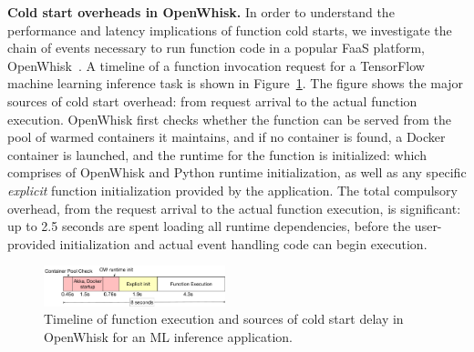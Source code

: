 \noindent \textbf{Cold start overheads in OpenWhisk.} 
%
In order to understand the performance and latency implications of function cold starts, we investigate the chain of events necessary to run function code in a popular FaaS platform, OpenWhisk~\cite{openwhisk}.  
A timeline of a function invocation request for a TensorFlow machine learning inference task is shown in Figure~\ref{fig:timeline}. 
The figure shows the major sources of cold start overhead: from request arrival to the actual function execution. 
OpenWhisk first checks whether the function can be served from the  pool of warmed containers it maintains, and if no container is found, a Docker container is launched, and the runtime for the function is initialized: which comprises of OpenWhisk and Python runtime initialization, as well as any specific \emph{explicit} function initialization provided by the application. 
The total compulsory overhead, from the request arrival to the actual function execution, is significant: up to 2.5 seconds are spent loading all runtime dependencies, before the user-provided initialization and actual event handling code can begin execution. 


\begin{figure}[t]
  \centering
  \includegraphics[width=0.47\textwidth]{../figures/ow-timeline.pdf}
  \vspace*{\myfigspace}
  \caption{Timeline of function execution and sources of cold start delay in OpenWhisk for an ML inference application.}
  \label{fig:timeline}
\end{figure}


